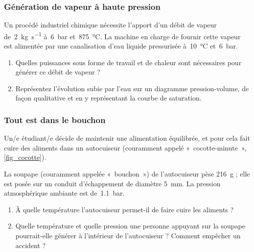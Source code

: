 \subsubsection{Génération de vapeur à haute pression}
\label{exo_generation_vapeur}

	Un procédé industriel chimique nécessite l’apport d’un débit de vapeur de~\SI{2}{\kilogram\per\second} à~\SI{6}{\bar} et~\SI{875}{\degreeCelsius}. La machine en charge de fournir cette vapeur est alimentée par une canalisation d’eau liquide pressurisée à~\SI{10}{\degreeCelsius} et~\SI{6}{\bar}.

	\begin{enumerate}
		\item Quelles puissances sous forme de travail et de chaleur sont nécessaires pour générer ce débit de vapeur ?
		\item Représentez l’évolution subie par l’eau sur un diagramme pression-volume, de façon qualitative et en y représentant la courbe de saturation.
	\end{enumerate}


\subsubsection{Tout est dans le bouchon}
\label{exo_cocotteminute}

	Un/e étudiant/e décide de maintenir une alimentation équilibrée, et pour cela fait cuire des aliments dans un autocuiseur (couramment appelé «~cocotte-minute~», \cref{fig_cocotte}).
		
	La soupape (couramment appelée «~bouchon~») de l’autocuiseur pèse \SI{216}{\gram} ; elle est posée sur un conduit d’échappement de diamètre \SI{5}{\milli\metre}. La pression atmosphérique ambiante est de~\SI{1,1}{\bar}.
	
	\begin{enumerate}
		\item À quelle température l’autocuiseur permet-il de faire cuire les aliments ?
		\item Quelle température et quelle pression une personne appuyant sur la soupape pourrait-elle générer à l’intérieur de l’autocuiseur ? Comment empêcher un accident ?
	\end{enumerate}

